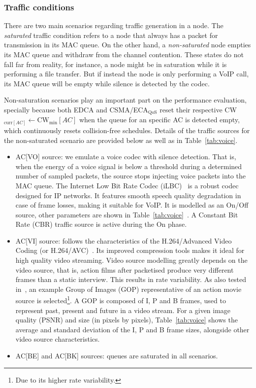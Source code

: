 \documentclass[a4paper]{article}
\begin{document}
\subsubsection{Traffic conditions}\label{traffic}
There are two main scenarios regarding traffic generation in a node. The \emph{saturated} traffic condition refers to a node that always has a packet for transmission in its MAC queue. On the other hand, a \emph{non-saturated} node empties its MAC queue and withdraw from the channel contention. These states do not fall far from reality, for instance, a node might be in saturation while it is performing a file transfer. But if instead the node is only performing a VoIP call, its MAC queue will be empty while silence is detected by the codec.

Non-saturation scenarios play an important part on the performance evaluation, specially because both EDCA and CSMA/ECA$_\text{QoS}$ reset their respective CW$_{\text{curr}[AC]}\leftarrow\text{CW}_{\min}[AC]$ when the queue for an specific AC is detected empty, which continuously resets collision-free schedules. Details of the traffic sources for the non-saturated scenario are provided below as well as in Table~\ref{tab:voice}.
	\begin{itemize}
		\item AC[VO] source: we emulate a voice codec with silence detection. That is, when the energy of a voice signal is below a threshold during a determined number of sampled packets, the source stops injecting voice packets into the MAC queue. The Internet Low Bit Rate Codec (iLBC)~\cite{andersen2004internet} is a robust codec designed for IP networks. It features smooth speech quality degradation in case of frame losses, making it suitable for VoIP. It is modelled as an On/Off source, other parameters are shown in Table~\ref{tab:voice}~\cite{menth2009source}. A Constant Bit Rate (CBR) traffic source is active during the On phase.
		
		\item AC[VI] source: follows the characteristics of the H.264/Advanced Video Coding (or H.264/AVC)~\cite{van2008traffic}. Its improved compression tools makes it ideal for high quality video streaming. Video source modelling greatly depends on the video source, that is, action films after packetised produce very different frames than a static interview. This results in rate variability. As also tested in~\cite{van2008traffic}, an example Group of Images (GOP) representative of an action movie source is selected\footnote{Due to its higher rate variability.}. A GOP is composed of I, P and B frames, used to represent past, present and future in a video stream. For a given image quality (PSNR) and size (in pixels by pixels), Table~\ref{tab:voice} shows the average and standard deviation of the I, P and B frame sizes, alongside other video source characteristics.
		
		\item AC[BE] and AC[BK] sources: queues are saturated in all scenarios.
	\end{itemize}
	
\end{document}
